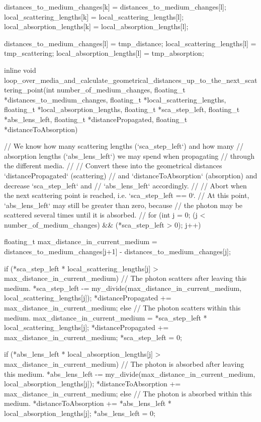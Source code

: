 \begin{ccode}
{{{{        distances_to_medium_changes[k] = distances_to_medium_changes[l];
        local_scattering_lengths[k] = local_scattering_lengths[l];
        local_absorption_lengths[k] = local_absorption_lengths[l];

        distances_to_medium_changes[l] = tmp_distance;
        local_scattering_lengths[l] = tmp_scattering;
        local_absorption_lengths[l] = tmp_absorption;
      }
    }
  }
}

inline void loop_over_media_and_calculate_geometrical_distances_up_to_the_next_scattering_point(int number_of_medium_changes, floating_t *distances_to_medium_changes, floating_t *local_scattering_lengths, floating_t *local_absorption_lengths, floating_t *sca_step_left, floating_t *abs_lens_left, floating_t *distancePropagated, floating_t *distanceToAbsorption)
{
  // We know how many scattering lengths (`sca_step_left`) and how many
  // absorption lengths (`abs_lens_left`) we may spend when propagating
  // through the different media.
  //
  // Convert these into the geometrical distances `distancePropagated` (scattering)
  // and `distanceToAbsorption` (absorption) and decrease `sca_step_left` and
  // `abs_lens_left` accordingly.
  //
  // Abort when the next scattering point is reached, i.e. `sca_step_left == 0`.
  // At this point, `abs_lens_left` may still be greater than zero, because
  // the photon may be scattered several times until it is absorbed.
  //
  for (int j = 0; (j < number_of_medium_changes) && (*sca_step_left > 0); j++) {
    floating_t max_distance_in_current_medium = distances_to_medium_changes[j+1] - distances_to_medium_changes[j];

    if (*sca_step_left * local_scattering_lengths[j] > max_distance_in_current_medium) {
      // The photon scatters after leaving this medium.
      *sca_step_left -= my_divide(max_distance_in_current_medium, local_scattering_lengths[j]);
      *distancePropagated += max_distance_in_current_medium;
    } else {
      // The photon scatters within this medium.
      max_distance_in_current_medium = *sca_step_left * local_scattering_lengths[j];
      *distancePropagated += max_distance_in_current_medium;
      *sca_step_left = 0;
    }

    if (*abs_lens_left * local_absorption_lengths[j] > max_distance_in_current_medium) {
      // The photon is absorbed after leaving this medium.
      *abs_lens_left -= my_divide(max_distance_in_current_medium, local_absorption_lengths[j]);
      *distanceToAbsorption += max_distance_in_current_medium;
    } else {
      // The photon is absorbed within this medium.
      *distanceToAbsorption += *abs_lens_left * local_absorption_lengths[j];
      *abs_lens_left = 0;
    }
  }

}
\end{ccode}
